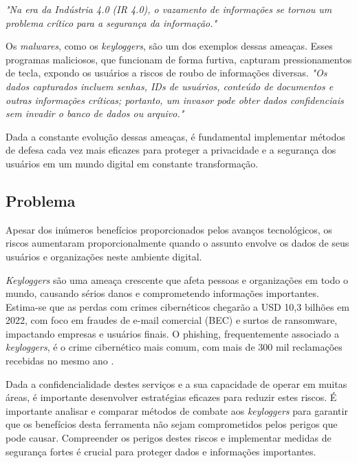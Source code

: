 \documentclass[12pt]{article}
\begin{document}
\textit{"Na era da Indústria 4.0 (IR 4.0), o vazamento de informações se
tornou um problema crítico para a segurança da informação."} \citep{bhaharin2019issues}

Os \textit{malwares}, como os \textit{keyloggers}, são um dos exemplos dessas ameaças. 
Esses programas maliciosos, que funcionam de forma furtiva, capturam pressionamentos de tecla,
expondo os usuários a riscos de roubo de informações diversas. \textit{"Os dados
capturados incluem senhas, IDs de usuários, conteúdo de documentos
e outras informações críticas; portanto, um invasor pode obter dados
confidenciais sem invadir o banco de dados ou arquivo."} \citep{ahmed2014survey}

Dada a constante evolução dessas ameaças, é fundamental implementar métodos de defesa cada vez mais eficazes para proteger a privacidade e a segurança dos usuários em um mundo digital em constante transformação.

\subsection{Problema}


Apesar dos inúmeros benefícios proporcionados pelos avanços tecnológicos, os riscos aumentaram proporcionalmente quando o assunto envolve os dados de seus usuários e organizações neste ambiente digital.

\textit{Keyloggers} são uma ameaça crescente que afeta pessoas e organizações em todo o mundo, causando sérios danos e comprometendo informações importantes. Estima-se que as perdas com crimes cibernéticos chegarão a USD 10,3 bilhões em 2022, com foco em fraudes de e-mail comercial (BEC) e surtos de ransomware, impactando empresas e usuários finais. O phishing, frequentemente associado a \textit{keyloggers}, é o crime cibernético mais comum, com mais de 300 mil reclamações recebidas no mesmo ano \citep{securityintelligence2023}.

Dada a confidencialidade destes serviços e a sua capacidade de operar em muitas áreas, é importante desenvolver estratégias eficazes para reduzir estes riscos. É importante analisar e comparar métodos de combate aos \textit{keyloggers} para garantir que os benefícios desta ferramenta não sejam comprometidos pelos perigos que pode causar. Compreender os perigos destes riscos e implementar medidas de segurança fortes é crucial para proteger dados e informações importantes.
\end{document}
